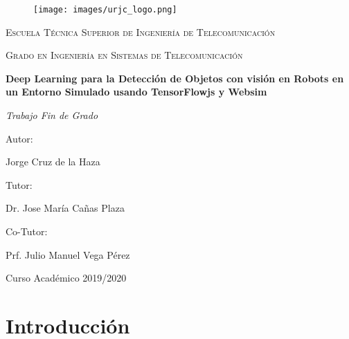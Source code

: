\documentclass{report}
\begin{document}
\begin{titlepage}
\centering

\begin{figure}[t]
\texttt{[image: images/urjc\_logo.png]}
\centering
\vspace{0.5cm} %
\end{figure}

{\scshape\Large Escuela Técnica Superior de Ingeniería de Telecomunicación \par}
\vspace{1cm}
{\scshape\Large Grado en Ingeniería en Sistemas de Telecomunicación \par}
\vspace{3cm}
{\bfseries\LARGE Deep Learning para la Detección de Objetos con visión en Robots en un Entorno Simulado usando TensorFlowjs y Websim \par}
\vspace{3cm}
{\itshape\Large Trabajo Fin de Grado \par}
\vfill
{\Large Autor: }
{\Large Jorge Cruz de la Haza \par}
{\Large Tutor: }
{\Large Dr. Jose María Cañas Plaza \par}
{\Large Co-Tutor: }
{\Large Prf. Julio Manuel Vega Pérez \par}
\vfill
{\Large Curso Académico 2019/2020 \par}
\end{titlepage} 

\renewcommand{\abstractname}{\Large Resumen}
\begin{abstract}
Hablar de Robótica. Cada vez son más los ejemplos que encontramos en nuestro día a día.

Hablar de Kibotics

Hablar de la Ciudad simulada


\end{abstract}

\setcounter{tocdepth}{3} %
\renewcommand{\contentsname}{Índice general}
\tableofcontents
\clearpage

\renewcommand{\listfigurename}{Índice de figuras}
\listoffigures

\renewcommand{\listtablename}{Índice de tablas}
\listoftables

\renewcommand{\chaptername}{Capítulo}
\chapter{Introducción}
\end{document}
